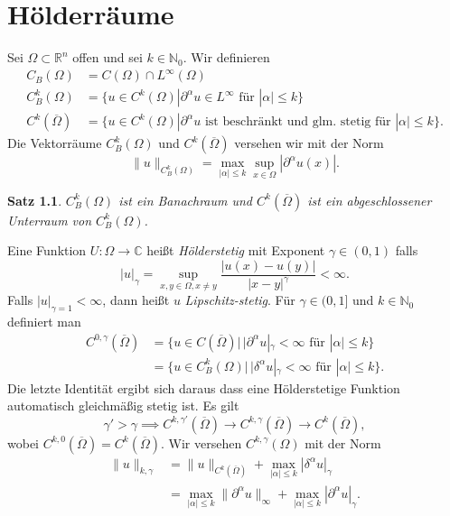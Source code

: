 \documentclass[
paper=a4,
bibtotocnumbered,
liststotocnumbered,
tablecaptionabove,
pointlessnumbers,
twoside,
openright,
10pt
]
{report}
\newtheorem{satz}[thm]{Satz}
\theoremstyle{definition}
\numberwithin{equation}{chapter}
\begin{document}
\chapter{Hölderräume}
Sei $\Omega \subset \mathbb R^n$ offen und sei $k\in \mathbb N_0$. Wir definieren
\begin{align*}
C_B(\Omega) &= C(\Omega) \cap L^\infty (\Omega)\\
C_B^k(\Omega) &= \{u\in C^k(\Omega) |\partial^\alpha u\in L^\infty \text{ für } |\alpha|\le k\}\\
C^k(\overline{\Omega}) &= \{u\in C^k(\Omega) |\partial^\alpha u \text{ ist beschränkt und glm. stetig für } |\alpha|\le k\}.
\end{align*}
Die Vektorräume $C_B^k(\Omega)$ und $C^k(\overline{\Omega})$ versehen wir mit der Norm
\begin{equation}
\|u\|_{C_B^k(\Omega)} = \max_{|\alpha|\le k} \sup_{x\in \Omega} |\partial^\alpha u(x)|.
\end{equation}
\begin{satz}
$C_B^k(\Omega)$ ist ein Banachraum und $C^k(\overline{\Omega})$ ist ein abgeschlossener Unterraum von $C_B^k(\Omega)$.
\end{satz}
Eine Funktion $U: \Omega \to \mathbb C$ heißt \emph{Hölderstetig} mit Exponent $\gamma \in (0,1)$ falls
\begin{equation}
|u|_\gamma = \sup_{x,y \in \Omega, x\neq y} \frac{|u(x)-u(y)|}{|x-y|^\gamma} < \infty.
\end{equation}
Falls $|u|_{\gamma=1} <\infty$, dann heißt $u$ \emph{Lipschitz-stetig}. Für $\gamma \in (0,1]$ und $k\in \mathbb N_0$ definiert man
\begin{align*}
C^{0,\gamma}(\overline{\Omega}) &= \{ u\in C(\overline{\Omega}) |\, |\partial^\alpha u|_\gamma <\infty \text{ für } |\alpha|\le k\}\\
&= \{u\in C_B^k(\Omega) | \, |\delta^\alpha u|_\gamma <\infty \text{ für } |\alpha|\le k\}.
\end{align*}
Die letzte Identität ergibt sich daraus dass eine Hölderstetige Funktion automatisch gleichmäßig stetig ist. Es gilt
\begin{equation}
\gamma' >\gamma \implies C^{k,\gamma'}(\overline{\Omega}) \to C^{k,\gamma}(\overline{\Omega}) \to C^k(\overline{\Omega}),
\end{equation}
wobei $C^{k,0}(\overline{\Omega}) = C^k(\overline{\Omega})$. Wir versehen $C^{k,\gamma}(\Omega)$ mit der Norm
\begin{equation}\label{eq:a1}
\begin{split}
\| u\|_{k,\gamma} &= \| u\|_{C^k(\overline{\Omega})} + \max_{|\alpha|\le k} |\delta^\alpha u|_\gamma\\
&= \max_{|\alpha|\le k} \| \partial^\alpha u\|_\infty + \max_{|\alpha|\le k} |\partial^\alpha u|_\gamma. 
\end{split}
\end{equation}
\end{document}
